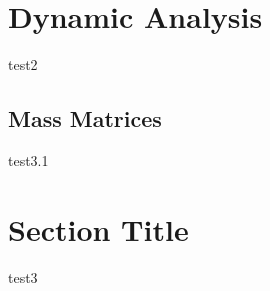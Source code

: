 \section{Dynamic Analysis}
\label{sec:dynAna}

test2

\subsection{Mass Matrices}
\label{sec:section3.1}

test3.1

\section{Section Title}
\label{sec:section3.2}

test3
